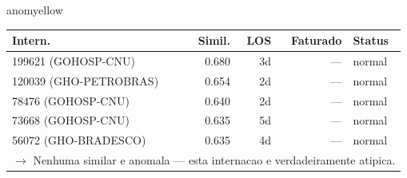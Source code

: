 \documentclass[a4paper,10pt]{article}
\begin{document}
\begin{anomalycard}[Internacao 166670 | GHO-PETROBRAS | MODERADO (z=2.09)]{anomyellow}
\begin{tabular}{l r r r l}\toprule\textbf{Intern.} & \textbf{Simil.} & \textbf{LOS} & \textbf{Faturado} & \textbf{Status} \\\midrule
199621 (GOHOSP-CNU) & 0.680 & 3d & --- & \textcolor{jcubeblue}{normal} \\
120039 (GHO-PETROBRAS) & 0.654 & 2d & --- & \textcolor{jcubeblue}{normal} \\
78476 (GOHOSP-CNU) & 0.640 & 2d & --- & \textcolor{jcubeblue}{normal} \\
73668 (GOHOSP-CNU) & 0.635 & 5d & --- & \textcolor{jcubeblue}{normal} \\
56072 (GHO-BRADESCO) & 0.635 & 4d & --- & \textcolor{jcubeblue}{normal} \\
\multicolumn{5}{l}{\textcolor{jcubeblue}{\small $\rightarrow$ Nenhuma similar e anomala --- esta internacao e verdadeiramente atipica.}} \\
\bottomrule\end{tabular}


\end{anomalycard}

\newpage
\end{document}
